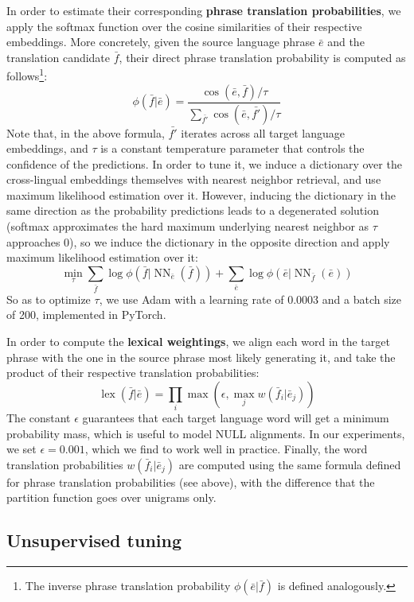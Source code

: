 \documentclass[11pt,a4paper]{article}
\DeclareMathOperator{\nn}{NN}
\DeclareMathOperator{\lex}{lex}
\begin{document}
In order to estimate their corresponding \textbf{phrase translation probabilities}, we apply the softmax function over the cosine similarities of their respective embeddings. More concretely, given the source language phrase $\bar{e}$ and the translation candidate $\bar{f}$, their direct phrase translation probability is computed as follows\footnote{The inverse phrase translation probability $\phi ( \bar{e} | \bar{f} )$ is defined analogously.}:
\[ \phi ( \bar{f} | \bar{e} ) = \frac{ \cos( \bar{e}, \bar{f} ) / \tau}{\sum_{\bar{f'}} \cos ( \bar{e}, \bar{f'} ) / \tau}\]
Note that, in the above formula, $\bar{f'}$ iterates across all target language embeddings, and $\tau$ is a constant temperature parameter that controls the confidence of the predictions. In order to tune it, we induce a dictionary over the cross-lingual embeddings themselves with nearest neighbor retrieval, and use maximum likelihood estimation over it. However, inducing the dictionary in the same direction as the probability predictions leads to a degenerated solution (softmax approximates the hard maximum underlying nearest neighbor as $\tau$ approaches 0), so we induce the dictionary in the opposite direction and apply maximum likelihood estimation over it:
\[ \min_\tau \sum_{\bar{f}} \log \phi ( \bar{f} | \nn_{\bar{e}} (\bar{f}) ) + \sum_{\bar{e}} \log \phi ( \bar{e} | \nn_{\bar{f}} (\bar{e}) ) \]
So as to optimize $\tau$, we use Adam with a learning rate of 0.0003 and a batch size of 200, implemented in PyTorch.

In order to compute the \textbf{lexical weightings}, we align each word in the target phrase with the one in the source phrase most likely generating it, and take the product of their respective translation probabilities:
\[ \lex ( \bar{f} | \bar{e} ) = \prod_i \max \left( \epsilon, \max_j w (\bar{f}_i | \bar{e}_j) \right) \]
The constant $\epsilon$ guarantees that each target language word will get a minimum probability mass, which is useful to model NULL alignments. In our experiments, we set $\epsilon=0.001$, which we find to work well in practice. Finally, the word translation probabilities $w (\bar{f}_i | \bar{e}_j)$ are computed using the same formula defined for phrase translation probabilities (see above), with the difference that the partition function goes over unigrams only.


\subsection{Unsupervised tuning} \label{subsec:tuning}
\end{document}
